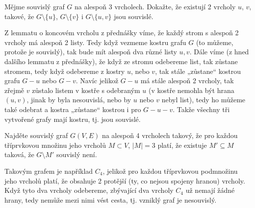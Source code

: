 \documentclass[12pt]{article}					%
\begin{document}
\pagebreak

\begin{priklad}[3]
    Mějme souvislý graf $G$ na alespoň 3 vrcholech. Dokažte, že existují 2 vrcholy $u$, $v$, takové, že $G \setminus \{u\}$, $G \setminus \{v\}$ i $G \setminus \{u, v\}$ jsou souvislé.
    
    \begin{reseni}
        Z lemmatu o koncovém vrcholu z přednášky víme, že každý strom s alespoň 2 vrcholy má alespoň 2 listy. Tedy když vezmeme kostru grafu $G$ (to můžeme, protože je souvislý), tak bude mít alespoň dva různé listy $u, v$. Dále víme (z hned dalšího lemmatu z přednášky), že když ze stromu odebereme list, tak zůstane stromem, tedy když odebereme z kostry $u$, nebo $v$, tak stále „zůstane“ kostrou grafu $G-u$ nebo $G-v$. Navíc jelikož $G-u$ má stále alespoň 2 vrcholy, tak zřejmě $v$ zůstalo listem v kostře s odebraným $u$ (v kostře nemohla být hrana $(u, v)$, jinak by byla nesouvislá, nebo by $u$ nebo $v$ nebyl list), tedy ho můžeme také odebrat a kostra „zůstane“ kostrou i pro $G - u - v$. Takže všechny tři vytvořené grafy mají kostru, tj. jsou souvislé.
    \end{reseni}
\end{priklad}

\begin{priklad}[4]
    Najděte souvislý graf $G(V, E)$ na alespoň 4 vrcholech takový, že pro každou tříprvkovou množinu jeho vrcholů $M \subset V$, $|M| = 3$ platí, že existuje $M' \subseteq M$ taková, že $G \setminus M'$ souvislý není.

    \begin{reseni}
        Takovým grafem je například $C_4$, jelikož pro každou tříprvkovou podmnožinu jeho vrcholů platí, že obsahuje 2 protější (ty, co nejsou spojeny hranou) vrcholy. Když tyto dva vrcholy odebereme, zbývající dva vrcholy $C_4$ už nemají žádné hrany, tedy nemůže mezi nimi vést cesta, tj. vzniklý graf je nesouvislý.
    \end{reseni}
\end{priklad}
\end{document}
